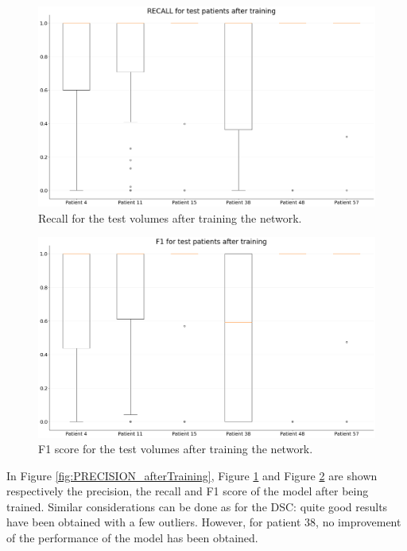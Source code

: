 \documentclass[12pt]{extarticle}
\begin{document}
\begin{figure}[h!]
\centering
\includegraphics[width = \textwidth]{RECALL_afterTraining.png}
\caption{Recall for the test volumes after training the network.}
\label{fig:RECALL_afterTraining}
\end{figure}

\begin{figure}[h!]
\centering
\includegraphics[width = \textwidth]{F1_afterTraining.png}
\caption{F1 score for the test volumes after training the network.}
\label{fig:F1_afterTraining}
\end{figure}

\noindent In Figure \ref{fig:PRECISION_afterTraining}, Figure \ref{fig:RECALL_afterTraining} and Figure \ref{fig:F1_afterTraining} are shown respectively the precision, the recall and F1 score of the model after being trained.
Similar considerations can be done as for the DSC: quite good results have been obtained with a few outliers. However, for patient 38, no improvement of the performance of the model has been obtained.
\end{document}
